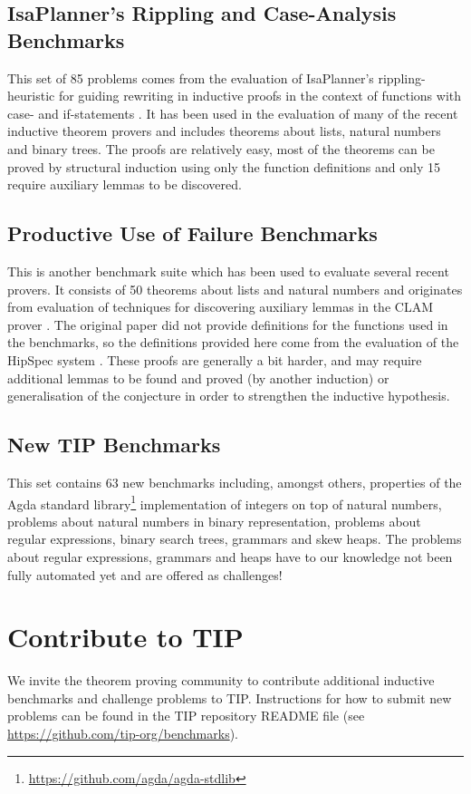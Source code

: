 \documentclass{llncs}
\begin{document}
\subsection{IsaPlanner's Rippling and Case-Analysis Benchmarks}
\label{sec:isap}
This set of 85 problems comes from the evaluation of IsaPlanner's rippling-heuristic for guiding rewriting in inductive proofs in the context of functions with case- and if-statements \cite{IsaPcase}. It has been used in the evaluation of many of the recent inductive theorem provers and includes theorems about lists, natural numbers and binary trees. The proofs are relatively easy, most of the theorems can be proved by structural induction using only the function definitions and only 15 require auxiliary lemmas to be discovered.

\subsection{Productive Use of Failure Benchmarks}
This is another benchmark suite which has been used to evaluate several recent provers. It consists of 50 theorems about lists and natural numbers and originates from evaluation of techniques for discovering auxiliary lemmas in the CLAM prover \cite{productiveuse}. The original paper did not provide definitions for the functions used in the benchmarks, so the definitions provided here come from the evaluation of the HipSpec system \cite{hipspecCADE}. These proofs are generally a bit harder, and may require additional lemmas to be found and proved (by another induction) or generalisation of the conjecture in order to strengthen the inductive hypothesis.

\subsection{New TIP Benchmarks}
This set contains 63 new benchmarks including, amongst others,
properties of the Agda standard
library\footnote{\url{https://github.com/agda/agda-stdlib}}
implementation of integers on top of natural numbers, problems about natural numbers in binary representation, problems about regular expressions, binary search trees, grammars and skew heaps. The problems about regular expressions, grammars and heaps have to our knowledge not been fully automated yet and are offered as challenges!

\section{Contribute to TIP}
We invite the theorem proving community to contribute additional inductive benchmarks and challenge problems to TIP. Instructions for how to submit new problems can be found in the TIP repository README file (see \url{https://github.com/tip-org/benchmarks}).
\end{document}
